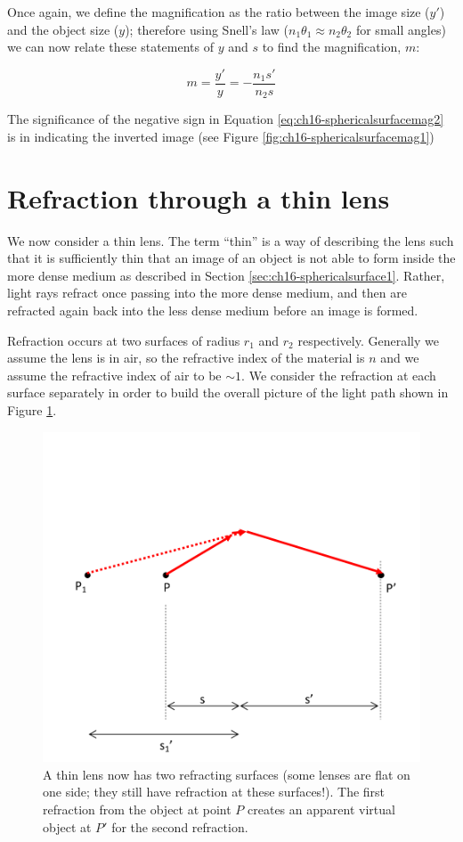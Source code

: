 \documentclass[
]{book}
\begin{document}
Once again, we define the magnification as the ratio between the image size (\(y'\)) and the object size (\(y\)); therefore using Snell's law (\(n_1 \theta_1 \approx n_2 \theta_2\) for small angles) we can now relate these statements of \(y\) and \(s\) to find the magnification, \(m\):

\begin{equation}
m = \frac{y'}{y} = -\frac{n_1 s'}{n_2 s}
\label{eq:ch16-sphericalsurfacemag2}
\end{equation}

The significance of the negative sign in Equation \eqref{eq:ch16-sphericalsurfacemag2} is in indicating the inverted image (see Figure \ref{fig:ch16-sphericalsurfacemag1})

\hypertarget{sec:ch16-thinlens1}{%
\section{Refraction through a thin lens}\label{sec:ch16-thinlens1}}

We now consider a thin lens. The term ``thin'' is a way of describing the lens such that it is sufficiently thin that an image of an object is not able to form inside the more dense medium as described in Section \ref{sec:ch16-sphericalsurface1}. Rather, light rays refract once passing into the more dense medium, and then are refracted again back into the less dense medium before an image is formed.

Refraction occurs at two surfaces of radius \(r_1\) and \(r_2\) respectively. Generally we assume the lens is in air, so the refractive index of the material is \(n\) and we assume the refractive index of air to be \(\sim 1\). We consider the refraction at each surface separately in order to build the overall picture of the light path shown in Figure \ref{fig:ch16-thinlens1}.

\begin{figure}

{\centering \includegraphics[width=0.7\linewidth]{visualisations/LaTeX/ch16-thinlightlens1} 

}

\caption{A thin lens now has two refracting surfaces (some lenses are flat on one side; they still have refraction at these surfaces!). The first refraction from the object at point $P$ creates an apparent virtual object at $P'$ for the second refraction.}\label{fig:ch16-thinlens1}
\end{figure}
\end{document}
